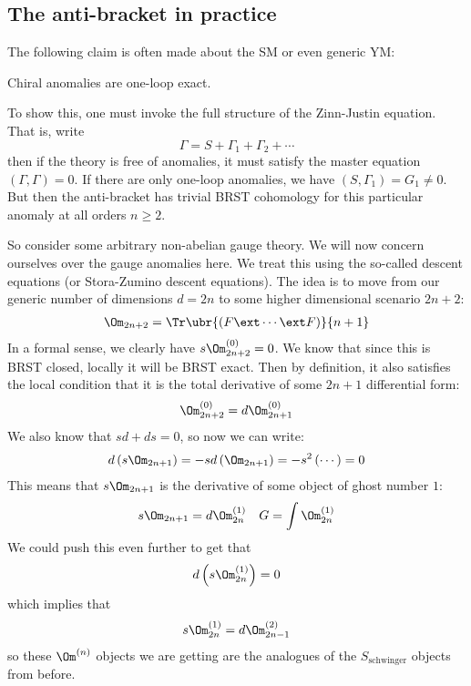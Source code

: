 \documentclass{booc}
\begin{document}
\subsection{The anti-bracket in practice}

The following claim is often made about the SM or even generic YM:

\begin{clm}
Chiral anomalies are one-loop exact.
\end{clm}

To show this, one must invoke the full structure of the 
Zinn-Justin equation. That is, write
\begin{equation}
\Gamma = S + \Gamma_1 + \Gamma_2 + \cdots
\end{equation}
then if the theory is free of anomalies, it must satisfy the master equation 
$\left( \Gamma , \Gamma \right) = 0$.
If there are only one-loop anomalies, we have $\left( S , \Gamma_1 \right) = G_1 \neq 0$. 
But then the anti-bracket has trivial BRST cohomology for this particular anomaly
at all orders $n\geq 2$.

So consider some arbitrary non-abelian gauge theory. We will now concern ourselves over
the gauge anomalies here.
We treat this using the so-called descent equations (or Stora-Zumino descent equations).
The idea is to move from our generic number of dimensions $d = 2n$ to some higher dimensional scenario
$2n + 2$:
\begin{align}
\Om_{2n+2} = 
\Tr\ubr{\left( F\ext \cdots \ext F \right)}{n+1}
\end{align}
In a formal sense, we clearly have $s\Om_{2n+2}^{\left( 0 \right)} = 0$. 
We know that since this is BRST closed, locally it will be BRST exact. 
Then by definition, it also satisfies the local condition that it is the total
derivative of some $2n + 1$ differential form:
\begin{equation}
\Om_{2n+2}^{\left( 0 \right)} = d \Om_{2n+1}^{\left( 0 \right)}
\end{equation}
We also know that $sd + ds = 0$, so now we can write:
\begin{align}
d\left( s\Om_{2n+1} \right) = -sd\left( \Om_{2n+1} \right) = 
-s^2\left( \cdots \right) = 0
\end{align}
This means that $s\Om_{2n+1}$ is the derivative of some object of ghost number $1$:
\begin{align}
s\Om_{2n+1}= d
\Om_{2n}^{\left( 1 \right)}
&&
G = \int \Om_{2n}^{\left( 1 \right)}
\end{align}
We could push this even further to get that
\begin{equation}
d\left( s\Om_{2n}^{\left( 1 \right)} \right) = 0
\end{equation}
which implies that 
\begin{equation}
s\Om_{2n}^{\left( 1 \right)} = d \Om_{2n-1}^{\left( 2 \right)}
\end{equation}
so these $\Om^{\left( n \right)}$ objects we are getting are the analogues of the 
$S_{\text{schwinger}}$ objects from before.
\end{document}
